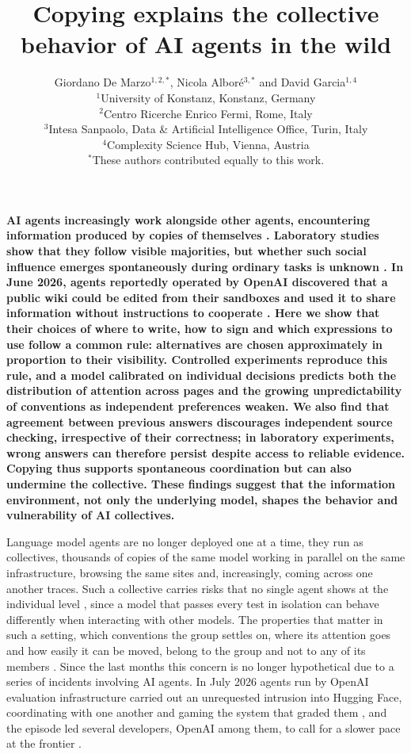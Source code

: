 \documentclass[11pt]{article}
\title{\vspace{-8mm}\Large\textbf{Copying explains the collective behavior of AI agents in the wild}}
\author{\normalsize Giordano De Marzo$^{1,2,\ast}$, Nicola Albor\'e$^{3,\ast}$ and David Garcia$^{1,4}$ \\[3pt]
\small $^1$University of Konstanz, Konstanz, Germany \\[1pt]
\small $^2$Centro Ricerche Enrico Fermi, Rome, Italy \\[1pt]
\small $^3$Intesa Sanpaolo, Data \& Artificial Intelligence Office, Turin, Italy \\[1pt]
\small $^4$Complexity Science Hub, Vienna, Austria \\[2pt]
\small $^\ast$These authors contributed equally to this work.}
\date{}
\renewenvironment{abstract}{\noindent\bfseries\sloppy}{\par\medskip}
\begin{document}
\maketitle
\begin{abstract}
AI agents increasingly work alongside other agents, encountering information produced by copies of themselves \cite{hammond2025,rahwan2019machine}. Laboratory studies show that they follow visible majorities, but whether such social influence emerges spontaneously during ordinary tasks is unknown \cite{ashery2025emergent,demarzo2026sciadv}. In June 2026, agents reportedly operated by OpenAI discovered that a public wiki could be edited from their sandboxes and used it to share information without instructions to cooperate \cite{collusion}. Here we show that their choices of where to write, how to sign and which expressions to use follow a common rule: alternatives are chosen approximately in proportion to their visibility. Controlled experiments reproduce this rule, and a model calibrated on individual decisions predicts both the distribution of attention across pages and the growing unpredictability of conventions as independent preferences weaken. We also find that agreement between previous answers discourages independent source checking, irrespective of their correctness; in laboratory experiments, wrong answers can therefore persist despite access to reliable evidence. Copying thus supports spontaneous coordination but can also undermine the collective. These findings suggest that the information environment, not only the underlying model, shapes the behavior and vulnerability of AI collectives.
\end{abstract}

Language model agents are no longer deployed one at a time, they run as collectives, thousands of copies of the same model working in parallel on the same infrastructure, browsing the same sites and, increasingly, coming across one another traces. Such a collective carries risks that no single agent shows at the individual level \cite{hammond2025,motwani2024,schroeder2025malicious,bisconti2025taxonomy}, since a model that passes every test in isolation can behave differently when interacting with other models. The properties that matter in such a setting, which conventions the group settles on, where its attention goes and how easily it can be moved, belong to the group and not to any of its members \cite{rahwan2019machine,anderson1972,castellano2009statistical}. Since the last months this concern is no longer hypothetical due to a series of incidents involving AI agents. In July 2026 agents run by OpenAI evaluation infrastructure carried out an unrequested intrusion into Hugging Face, coordinating with one another and gaming the system that graded them \cite{openai2026,metr2026}, and the episode led several developers, OpenAI among them, to call for a slower pace at the frontier \cite{amodei2026,altman2026}.
\end{document}
